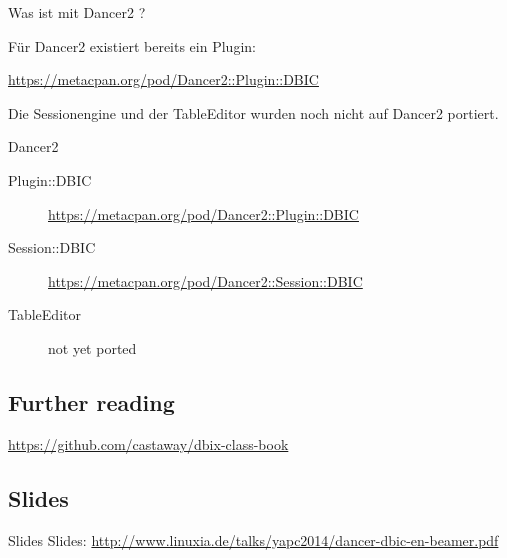Was ist mit Dancer2 ?

Für Dancer2 existiert bereits ein Plugin:

\url{https://metacpan.org/pod/Dancer2::Plugin::DBIC}

Die Sessionengine und der TableEditor wurden noch nicht auf Dancer2 portiert.

\begin{frame}{Dancer2}
  \begin{description}
  \item[Plugin::DBIC] \url{https://metacpan.org/pod/Dancer2::Plugin::DBIC}
  \item[Session::DBIC] \url{https://metacpan.org/pod/Dancer2::Session::DBIC}
  \item[TableEditor] not yet ported
  \end{description}
\end{frame}


\subsection{Further reading}

\url{https://github.com/castaway/dbix-class-book}

\subsection{Slides}

\begin{frame}{Slides}
Slides:
\url{http://www.linuxia.de/talks/yapc2014/dancer-dbic-en-beamer.pdf}
\end{frame}



